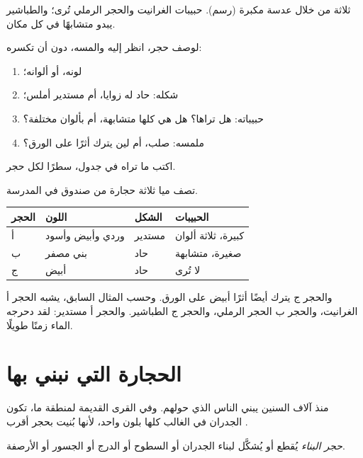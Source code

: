 \begin{omfigure}
{\small ثلاثة  من خلال عدسة مكبرة (رسم). حبيبات الغرانيت والحجر الرملي
تُرى؛ والطباشير يبدو متشابهًا في كل مكان.}
\label{fig:g3:stones-pebbles-sand:magnified}
\end{omfigure}

\begin{method}\label{met:g3:stones-pebbles-sand:look}
لوصف حجر، انظر إليه والمسه، دون أن تكسره:
\begin{enumerate}
  \item لونه، أو ألوانه؛
  \item شكله: حاد له زوايا، أم مستدير أملس؛
  \item حبيباته: هل تراها؟ هل هي كلها متشابهة، أم بألوان
        مختلفة؟
  \item ملمسه: صلب، أم لين يترك أثرًا على الورق؟
\end{enumerate}
اكتب ما تراه في جدول، سطرًا لكل حجر.
\end{method}

\begin{example}\label{ex:g3:stones-pebbles-sand:table}
تصف ميا ثلاثة حجارة من صندوق في المدرسة.
\begin{center}\small
\begin{tabular}{llll}
\hline
الحجر & اللون & الشكل & الحبيبات \\
\hline
أ & وردي وأبيض وأسود & مستدير & كبيرة، ثلاثة ألوان \\
ب & بني مصفر & حاد & صغيرة، متشابهة \\
ج & أبيض & حاد & لا تُرى \\
\hline
\end{tabular}
\end{center}
والحجر ج يترك أيضًا أثرًا أبيض على الورق. وحسب المثال السابق، يشبه الحجر أ
الغرانيت، والحجر ب الحجر الرملي، والحجر ج الطباشير. والحجر أ مستدير: لقد
دحرجه الماء زمنًا طويلًا.
\end{example}

\section{الحجارة التي نبني بها}

منذ آلاف السنين يبني الناس  الذي حولهم. وفي القرى القديمة لمنطقة ما،
تكون الجدران في الغالب كلها بلون واحد، لأنها بُنيت بحجر أقرب
.

\begin{definition}\label{def:g3:stones-pebbles-sand:building-stone}
\emph{حجر البناء}  يُقطع أو يُشكَّل لبناء الجدران
أو السطوح أو الدرج أو الجسور أو الأرصفة.
\end{definition}

